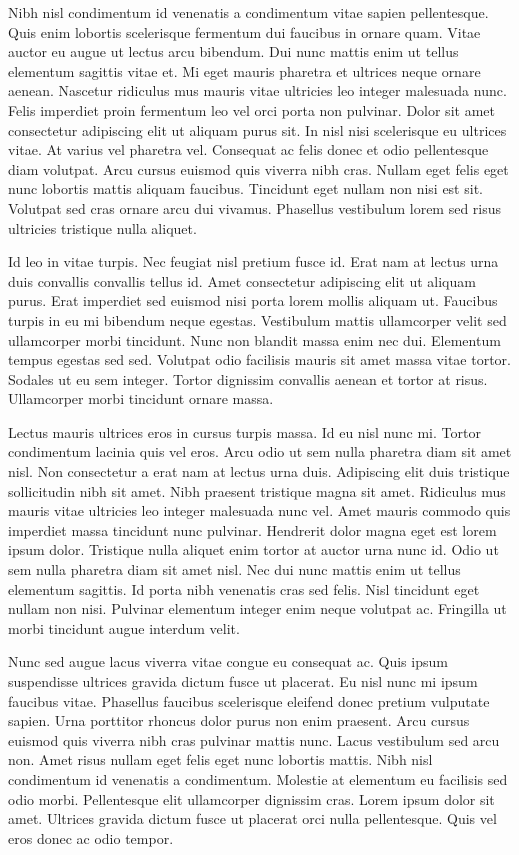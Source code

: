 \documentclass[11pt,a4paper]{article}
\begin{document}
Nibh nisl condimentum id venenatis a condimentum vitae sapien pellentesque. Quis enim lobortis scelerisque fermentum dui faucibus in ornare quam. Vitae auctor eu augue ut lectus arcu bibendum. Dui nunc mattis enim ut tellus elementum sagittis vitae et. Mi eget mauris pharetra et ultrices neque ornare aenean. Nascetur ridiculus mus mauris vitae ultricies leo integer malesuada nunc. Felis imperdiet proin fermentum leo vel orci porta non pulvinar. Dolor sit amet consectetur adipiscing elit ut aliquam purus sit. In nisl nisi scelerisque eu ultrices vitae. At varius vel pharetra vel. Consequat ac felis donec et odio pellentesque diam volutpat. Arcu cursus euismod quis viverra nibh cras. Nullam eget felis eget nunc lobortis mattis aliquam faucibus. Tincidunt eget nullam non nisi est sit. Volutpat sed cras ornare arcu dui vivamus. Phasellus vestibulum lorem sed risus ultricies tristique nulla aliquet.

Id leo in vitae turpis. Nec feugiat nisl pretium fusce id. Erat nam at lectus urna duis convallis convallis tellus id. Amet consectetur adipiscing elit ut aliquam purus. Erat imperdiet sed euismod nisi porta lorem mollis aliquam ut. Faucibus turpis in eu mi bibendum neque egestas. Vestibulum mattis ullamcorper velit sed ullamcorper morbi tincidunt. Nunc non blandit massa enim nec dui. Elementum tempus egestas sed sed. Volutpat odio facilisis mauris sit amet massa vitae tortor. Sodales ut eu sem integer. Tortor dignissim convallis aenean et tortor at risus. Ullamcorper morbi tincidunt ornare massa.

Lectus mauris ultrices eros in cursus turpis massa. Id eu nisl nunc mi. Tortor condimentum lacinia quis vel eros. Arcu odio ut sem nulla pharetra diam sit amet nisl. Non consectetur a erat nam at lectus urna duis. Adipiscing elit duis tristique sollicitudin nibh sit amet. Nibh praesent tristique magna sit amet. Ridiculus mus mauris vitae ultricies leo integer malesuada nunc vel. Amet mauris commodo quis imperdiet massa tincidunt nunc pulvinar. Hendrerit dolor magna eget est lorem ipsum dolor. Tristique nulla aliquet enim tortor at auctor urna nunc id. Odio ut sem nulla pharetra diam sit amet nisl. Nec dui nunc mattis enim ut tellus elementum sagittis. Id porta nibh venenatis cras sed felis. Nisl tincidunt eget nullam non nisi. Pulvinar elementum integer enim neque volutpat ac. Fringilla ut morbi tincidunt augue interdum velit.

Nunc sed augue lacus viverra vitae congue eu consequat ac. Quis ipsum suspendisse ultrices gravida dictum fusce ut placerat. Eu nisl nunc mi ipsum faucibus vitae. Phasellus faucibus scelerisque eleifend donec pretium vulputate sapien. Urna porttitor rhoncus dolor purus non enim praesent. Arcu cursus euismod quis viverra nibh cras pulvinar mattis nunc. Lacus vestibulum sed arcu non. Amet risus nullam eget felis eget nunc lobortis mattis. Nibh nisl condimentum id venenatis a condimentum. Molestie at elementum eu facilisis sed odio morbi. Pellentesque elit ullamcorper dignissim cras. Lorem ipsum dolor sit amet. Ultrices gravida dictum fusce ut placerat orci nulla pellentesque. Quis vel eros donec ac odio tempor.
\end{document}
